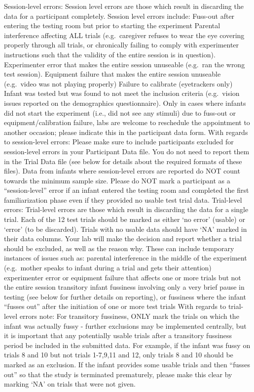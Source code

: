 \documentclass[
]{book}
\begin{document}
Session-level errors: Session level errors are those which result in discarding the data for a participant completely. Session level errors include:
Fuss-out after entering the testing room but prior to starting the experiment
Parental interference affecting ALL trials (e.g.~caregiver refuses to wear the eye covering properly through all trials, or chronically failing to comply with experimenter instructions such that the validity of the entire session is in question).
Experimenter error that makes the entire session unuseable (e.g.~ran the wrong test session).
Equipment failure that makes the entire session unuseable (e.g.~video was not playing properly)
Failure to calibrate (eyetrackers only)
Infant was tested but was found to not meet the inclusion criteria (e.g.~vision issues reported on the demographics questionnaire).
Only in cases where infants did not start the experiment (i.e., did not see any stimuli) due to fuss-out or equipment/calibration failure, labs are welcome to reschedule the appointment to another occasion; please indicate this in the participant data form.
With regards to session-level errors:
Please make sure to include participants excluded for session-level errors in your Participant Data file. You do not need to report them in the Trial Data file (see below for details about the required formats of these files). Data from infants where session-level errors are reported do NOT count towards the minimum sample size.
Please do NOT mark a participant as a ``session-level'' error if an infant entered the testing room and completed the first familiarization phase even if they provided no usable test trial data.
Trial-level errors: Trial-level errors are those which result in discarding the data for a single trial. Each of the 12 test trials should be marked as either `no error' (usable) or `error' (to be discarded). Trials with no usable data should have `NA' marked in their data columns. Your lab will make the decision and report whether a trial should be excluded, as well as the reason why. These can include temporary instances of issues such as:
parental interference in the middle of the experiment (e.g.~mother speaks to infant during a trial and gets their attention)
experimenter error or equipment failure that affects one or more trials but not the entire session
transitory infant fussiness involving only a very brief pause in testing (see below for further details on reporting), or fussiness where the infant ``fusses out'' after the initiation of one or more test trials
With regards to trial-level errors note:
For transitory fussiness, ONLY mark the trials on which the infant was actually fussy - further exclusions may be implemented centrally, but it is important that any potentially usable trials after a transitory fussiness period be included in the submitted data. For example, if the infant was fussy on trials 8 and 10 but not trials 1-7,9,11 and 12, only trials 8 and 10 should be marked as an exclusion.
If the infant provides some usable trials and then ``fusses out'' so that the study is terminated prematurely, please make this clear by marking `NA' on trials that were not given.
\end{document}
